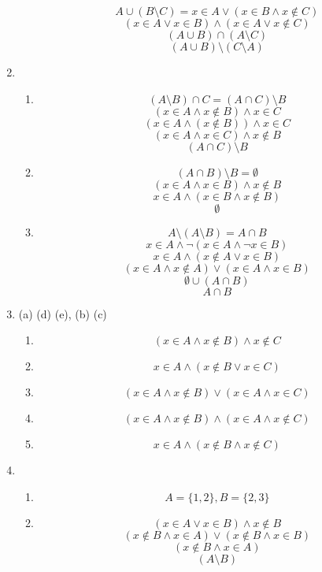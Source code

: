 \begin{enumerate}
\begin{enumerate}
        \[A \cup (B \setminus C) = x \in A \lor (x \in B \land x \notin C)\]
        \[(x \in A \lor x \in B) \land (x \in A \lor x \notin C)\]
        \[(A \cup B) \cap (A \setminus C)\]
        \[(A \cup B) \setminus (C \setminus A)\]
    \end{enumerate}
    \item
    \begin{enumerate}
        \item 
        \[(A \setminus B) \cap C = (A \cap C) \setminus B \]
        \[(x \in A \land x \notin B) \land x \in C\]
        \[(x \in A \land  (x \notin B)) \land x \in C\]
        \[(x \in A \land x \in C ) \land  x \notin B \]
        \[(A \cap C ) \setminus B\]
        \item 
        \[(A \cap B) \setminus B = \emptyset\]
        \[(x \in A \land x \in B) \land x \notin B\]
        \[x \in A \land (x \in B \land x \notin B)\]
        \[\emptyset\]
        \item 
        \[A \setminus (A \setminus B) = A \cap B\]
        \[x \in A \land \lnot (x \in A \land \lnot x \in B)\]
        \[x \in A \land (x \notin A \lor x \in B)\]
        \[(x \in A \land x \notin A) \lor (x \in A \land x \in B)\]
        \[\emptyset \cup (A \cap B)\]
        \[A \cap B\]
    \end{enumerate}
    \item (a) (d) (e), (b) (c) 
    \begin{enumerate}
        \item 
        \[(x \in A \land x \notin B) \land x \notin C\]
        \item 
        \[x \in A \land (x \notin B \lor x \in C)\]
        \item
        \[(x \in A \land x \notin B) \lor (x \in A \land x \in C)\]
        \item
        \[(x \in A \land x \notin B) \land (x \in A \land x \notin C)\]
        \item
        \[x \in A \land (x \notin B \land x \notin C)\]
    \end{enumerate}
    \item
    \begin{enumerate}
        \item \[A = \{1,2\}, B = \{2,3\}\]
        \item 
        \[(x \in A \lor x \in B) \land x \notin B\]
        \[(x \notin B \land x \in A) \lor (x \notin B \land x \in B)\]
        \[(x \notin B \land x \in A)\]
        \[(A \setminus B)\]
    \end{enumerate}

\end{enumerate}
